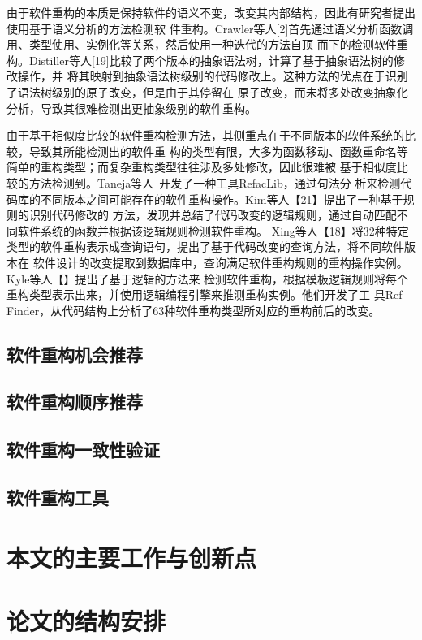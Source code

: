 由于软件重构的本质是保持软件的语义不变，改变其内部结构，因此有研究者提出使用基于语义分析的方法检测软
件重构。Crawler等人[2]首先通过语义分析函数调用、类型使用、实例化等关系，然后使用一种迭代的方法自顶
而下的检测软件重构。Distiller等人[19]比较了两个版本的抽象语法树，计算了基于抽象语法树的修改操作，并
将其映射到抽象语法树级别的代码修改上。这种方法的优点在于识别了语法树级别的原子改变，但是由于其停留在
原子改变，而未将多处改变抽象化分析，导致其很难检测出更抽象级别的软件重构。

由于基于相似度比较的软件重构检测方法，其侧重点在于不同版本的软件系统的比较，导致其所能检测出的软件重
构的类型有限，大多为函数移动、函数重命名等简单的重构类型；而复杂重构类型往往涉及多处修改，因此很难被
基于相似度比较的方法检测到。Taneja等人~\cite{taneja2007automated}开发了一种工具RefacLib，通过句法分
析来检测代码库的不同版本之间可能存在的软件重构操作。Kim等人【21】提出了一种基于规则的识别代码修改的
方法，发现并总结了代码改变的逻辑规则，通过自动匹配不同软件系统的函数并根据该逻辑规则检测软件重构。
Xing等人【18】将32种特定类型的软件重构表示成查询语句，提出了基于代码改变的查询方法，将不同软件版本在
软件设计的改变提取到数据库中，查询满足软件重构规则的重构操作实例。Kyle等人【】提出了基于逻辑的方法来
检测软件重构，根据模板逻辑规则将每个重构类型表示出来，并使用逻辑编程引擎来推测重构实例。他们开发了工
具Ref-Finder，从代码结构上分析了63种软件重构类型所对应的重构前后的改变。

\subsection{软件重构机会推荐}
\subsection{软件重构顺序推荐}
\subsection{软件重构一致性验证}
\subsection{软件重构工具}

\section{本文的主要工作与创新点}

\section{论文的结构安排}

